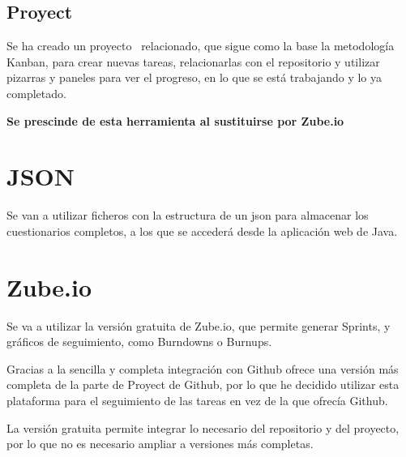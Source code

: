 \subsection{Proyect}

Se ha creado un proyecto~\cite{github:proyect} relacionado, que sigue como la base la metodología Kanban, para crear nuevas tareas, relacionarlas con el repositorio y utilizar pizarras y paneles para ver el progreso, en lo que se está trabajando y lo ya completado.

\textbf{Se prescinde de esta herramienta al sustituirse por Zube.io}

\section{JSON}

Se van a utilizar ficheros con la estructura de un json para almacenar los cuestionarios completos, a los que se accederá desde la aplicación web de Java.

\section{Zube.io}

Se va a utilizar la versión gratuita de Zube.io, que permite generar Sprints, y gráficos de seguimiento, como Burndowns o Burnups.

Gracias a la sencilla y completa integración con Github ofrece una versión más completa de la parte de Proyect de Github, por lo que he decidido utilizar esta plataforma para el seguimiento de las tareas en vez de la que ofrecía Github.

La versión gratuita permite integrar lo necesario del repositorio y del proyecto, por lo que no es necesario ampliar a versiones más completas.







